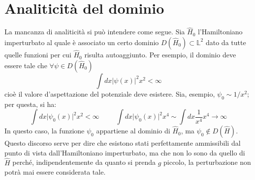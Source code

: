 \documentclass[10pt, a4paper]{scrartcl} %
\numberwithin{equation}{section}
\theoremstyle{style2}
\theoremstyle{style1}
\begin{document}
\section{Analiticit\`a del dominio}
La mancanza di analiticit\`a si pu\`o intendere come segue.
Sia $\hat{H}_0$ l'Hamiltoniano imperturbato al quale \`e associato un certo dominio $D(\hat{H}_0)\subset \mathbb{L}^2$ dato da tutte quelle funzioni per cui $\hat{H}_0$ risulta autoaggiunto.
Per esempio, il dominio deve essere tale che $\forall \psi \in D(\hat{H}_0)$
\[
\int dx \lvert \psi (x) \rvert ^2 x^2 < \infty
\] 
cio\`e il valore d'aspettazione del potenziale deve esistere.
Sia, esempio, $\psi _0\sim 1 / x^2$; per questa, si ha:
\[
\int dx \lvert \psi _0(x) \rvert ^2 x^2 < \infty \hspace{1cm} \int dx \lvert \psi _0(x) \rvert ^2 x^4 \sim \int dx \frac{1}{x^4} x^4 \to \infty
\] 
In questo caso, la funzione $\psi _0$ appartiene al dominio di $\hat{H}_0$, ma $\psi _0 \not \in D(\hat{H})$.
Questo discorso serve per dire che esistono stati perfettamente ammissibili dal punto di vista dall'Hamiltoniano imperturbato, ma che non lo sono da quello di $\hat{H}$ perch\'e, indipendentemente da quanto si prenda $g$ piccolo, la perturbazione non potr\`a mai essere considerata tale.
\end{document}
